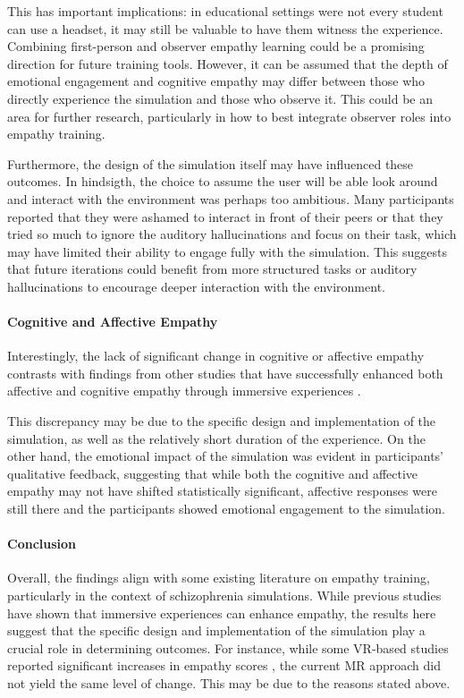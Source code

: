 This has important implications: in educational settings were not every student can use a headset, it may still be valuable to have them witness the experience. Combining first-person and observer empathy learning could be a promising direction for future training tools. However, it can be assumed that the depth of emotional engagement and cognitive empathy may differ between those who directly experience the simulation and those who observe it. This could be an area for further research, particularly in how to best integrate observer roles into empathy training. 

\vspace{1em}

Furthermore, the design of the simulation itself may have influenced these outcomes. In hindsigth, the choice to assume the user will be able look around and interact with the environment was perhaps too ambitious. Many participants reported that they were ashamed to interact in front of their peers or that they tried so much to ignore the auditory hallucinations and focus on their task, which may have limited their ability to engage fully with the simulation. This suggests that future iterations could benefit from more structured tasks or auditory hallucinations to encourage deeper interaction with the environment.

\paragraph{Cognitive and Affective Empathy}
Interestingly, the lack of significant change in cognitive or affective empathy contrasts with findings from other studies that have successfully enhanced both affective and cognitive empathy through immersive experiences \cite{Rueda2020, Ando2011}. 

This discrepancy may be due to the specific design and implementation of the simulation, as well as the relatively short duration of the experience. On the other hand, the emotional impact of the simulation was evident in participants' qualitative feedback, suggesting that while both the cognitive and affective empathy may not have shifted statistically significant, affective responses were still there and the participants showed emotional engagement to the simulation.

\paragraph{Conclusion}
Overall, the findings align with some existing literature on empathy training, particularly in the context of schizophrenia simulations. While previous studies have shown that immersive experiences can enhance empathy, the results here suggest that the specific design and implementation of the simulation play a crucial role in determining outcomes. For instance, while some VR-based studies reported significant increases in empathy scores \cite{Martingano2021, Ventura2020}, the current MR approach did not yield the same level of change. This may be due to the reasons stated above.


